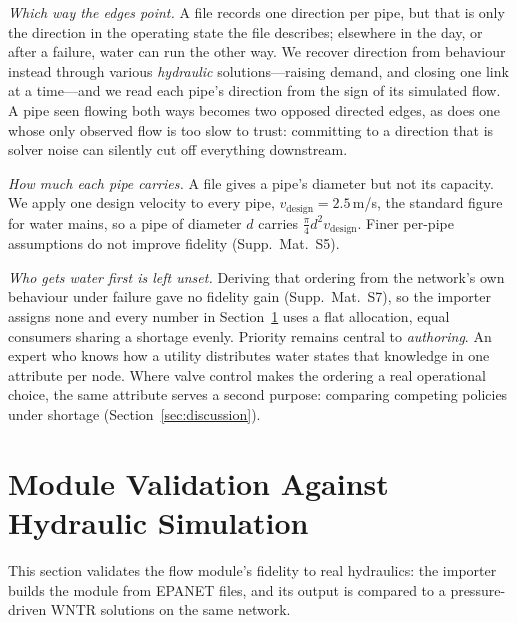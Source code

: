 \documentclass{svproc}
\begin{document}
  \emph{Which way the edges point.} A file records one direction per pipe, but that is
  only the direction in the operating state the file describes; elsewhere in the day, or
  after a failure, water can run the other way. We recover direction from behaviour
  instead through various \emph{hydraulic} solutions---raising demand, and
  closing one link at a time---and we read each pipe's direction from the sign of its
  simulated flow. A pipe seen flowing both ways
  becomes two opposed directed edges, as does one whose only observed flow is too slow to
  trust: committing to a direction that is solver noise can silently cut off
  everything downstream.

  \emph{How much each pipe carries.} A file gives a pipe's diameter but not its capacity.
  We apply one design velocity to every pipe, $v_{\text{design}}=2.5$\,m/s, the standard
  figure for water mains, so a pipe of diameter $d$ carries
  $\tfrac{\pi}{4}d^2 v_{\text{design}}$. Finer per-pipe assumptions do not improve fidelity (Supp.~Mat.~S5).

  \emph{Who gets water first is left unset.} Deriving that ordering from the network's own
  behaviour under failure gave no fidelity gain (Supp.~Mat.~S7), so the importer assigns
  none and every number in Section~\ref{sec:validation} uses a flat allocation, equal
  consumers sharing a shortage evenly. Priority remains central to \emph{authoring}. An
  expert who knows how a utility distributes water states that knowledge in one attribute
  per node. Where valve control makes the ordering a real operational choice, the same
  attribute serves a second purpose: comparing competing policies under shortage
  (Section~\ref{sec:discussion}).

  \section{Module Validation Against Hydraulic Simulation}\label{sec:validation}

  This section validates the flow module's fidelity to real hydraulics: the importer builds
  the module from EPANET files, and its output is compared to a pressure-driven WNTR solutions
  on the same network.
\end{document}
